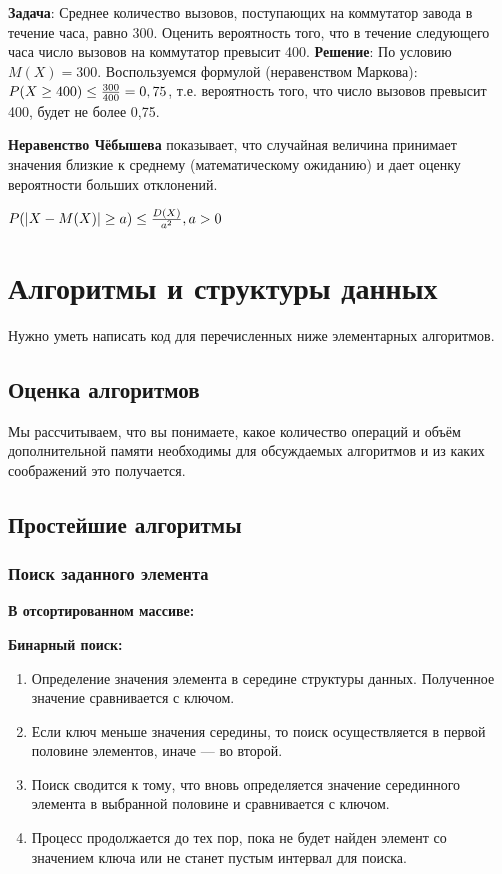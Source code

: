 \documentclass[12pt]{matmex-diploma}
\begin{document}
            \textbf{Задача}: Среднее количество вызовов, поступающих на коммутатор завода в течение часа, равно 300. Оценить вероятность того, что в течение следующего часа число вызовов на коммутатор превысит 400.
            \textbf{Решение}: По условию $M(X) = 300$. Воспользуемся формулой (неравенством Маркова): $P(X \geq 400) \leq {300\over{400}} = 0,75$, т.е. вероятность того, что число вызовов превысит 400, будет не более 0,75.
            
            \textbf{Неравенство Чёбышева} показывает, что случайная величина принимает значения близкие к среднему (математическому ожиданию) и дает оценку вероятности больших отклонений.
            
            $P(|X-M(X)| \geq a) \leq {D(X)\over{a^{2}}}, a>0$
            
\section{Алгоритмы и структуры данных}

    Нужно уметь написать код для перечисленных ниже элементарных алгоритмов.

    \subsection{Оценка алгоритмов}
    
        Мы рассчитываем, что вы понимаете, какое количество операций и объём дополнительной памяти необходимы для обсуждаемых алгоритмов и из каких соображений это получается.
    
    \subsection{Простейшие алгоритмы}
    
        \subsubsection*{Поиск заданного элемента}
            
            \textbf{В отсортированном массиве:}
            
                \textbf{Бинарный поиск:}
                
                \begin{enumerate}
                    \item Определение значения элемента в середине структуры данных. Полученное значение сравнивается с ключом.
                    \item Если ключ меньше значения середины, то поиск осуществляется в первой половине элементов, иначе — во второй.
                    \item Поиск сводится к тому, что вновь определяется значение серединного элемента в выбранной половине и сравнивается с ключом.
                    \item Процесс продолжается до тех пор, пока не будет найден элемент со значением ключа или не станет пустым интервал для поиска.
                \end{enumerate}
\end{document}
